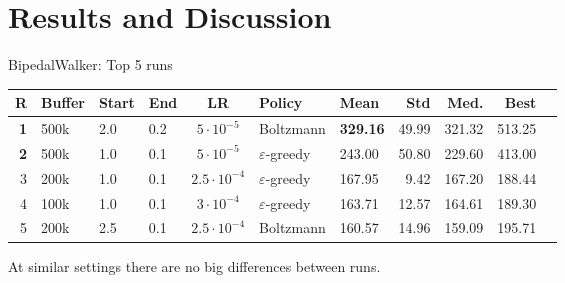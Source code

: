 \documentclass[aspectratio=169]{beamer}
\begin{document}
\section{Results and Discussion}

\begin{frame}{BipedalWalker: Top 5 runs}
  \begin{center}
    \footnotesize
    \setlength{\tabcolsep}{3pt}
    \begin{tabular}{rlllcllrrrr}
      \toprule
      \textbf{R} & \textbf{Buffer} & \textbf{Start} & \textbf{End} & \textbf{LR} & \textbf{Policy} & \textbf{Mean} & \textbf{Std} & \textbf{Med.} & \textbf{Best} \\
      \midrule
      \textbf{1} & 500k & 2.0 & 0.2 & $5\cdot10^{-5}$ & Boltzmann & \textbf{329.16} & 49.99 & 321.32 & 513.25 \\
      \textbf{2} & 500k & 1.0 & 0.1 & $5\cdot10^{-5}$ & $\varepsilon$-greedy & 243.00 & 50.80 & 229.60 & 413.00 \\
      3 & 200k & 1.0 & 0.1 & $2.5\cdot10^{-4}$ & $\varepsilon$-greedy & 167.95 & 9.42  & 167.20 & 188.44 \\
      4 & 100k & 1.0 & 0.1 & $3\cdot10^{-4}$ & $\varepsilon$-greedy & 163.71 & 12.57 & 164.61 & 189.30 \\
      5 & 200k & 2.5 & 0.1 & $2.5\cdot10^{-4}$ & Boltzmann & 160.57 & 14.96 & 159.09 & 195.71 \\
      \bottomrule
    \end{tabular}
  \end{center}
  \vspace{0.5em}
  \small
  
  \vspace{0.2em}
  At similar settings there are no big differences between runs.
\end{frame}
\end{document}
